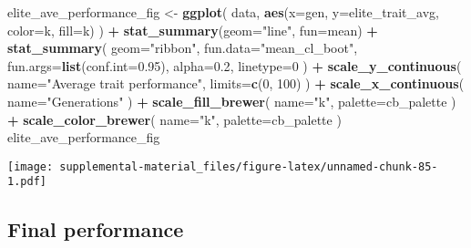 \documentclass[]{book}
\newenvironment{Shaded}{\begin{snugshade}}{\end{snugshade}}
\newcommand{\DataTypeTok}[1]{\textcolor[rgb]{0.13,0.29,0.53}{#1}}
\newcommand{\DecValTok}[1]{\textcolor[rgb]{0.00,0.00,0.81}{#1}}
\newcommand{\FloatTok}[1]{\textcolor[rgb]{0.00,0.00,0.81}{#1}}
\newcommand{\KeywordTok}[1]{\textcolor[rgb]{0.13,0.29,0.53}{\textbf{#1}}}
\newcommand{\NormalTok}[1]{#1}
\newcommand{\OperatorTok}[1]{\textcolor[rgb]{0.81,0.36,0.00}{\textbf{#1}}}
\newcommand{\StringTok}[1]{\textcolor[rgb]{0.31,0.60,0.02}{#1}}
\begin{document}
\begin{Shaded}
\begin{Highlighting}[]
\NormalTok{elite_ave_performance_fig <-}
\StringTok{  }\KeywordTok{ggplot}\NormalTok{(}
\NormalTok{    data,}
    \KeywordTok{aes}\NormalTok{(}\DataTypeTok{x=}\NormalTok{gen, }\DataTypeTok{y=}\NormalTok{elite_trait_avg, }\DataTypeTok{color=}\NormalTok{k, }\DataTypeTok{fill=}\NormalTok{k)}
\NormalTok{  ) }\OperatorTok{+}
\StringTok{  }\KeywordTok{stat_summary}\NormalTok{(}\DataTypeTok{geom=}\StringTok{"line"}\NormalTok{, }\DataTypeTok{fun=}\NormalTok{mean) }\OperatorTok{+}
\StringTok{  }\KeywordTok{stat_summary}\NormalTok{(}
    \DataTypeTok{geom=}\StringTok{"ribbon"}\NormalTok{,}
    \DataTypeTok{fun.data=}\StringTok{"mean_cl_boot"}\NormalTok{,}
    \DataTypeTok{fun.args=}\KeywordTok{list}\NormalTok{(}\DataTypeTok{conf.int=}\FloatTok{0.95}\NormalTok{),}
    \DataTypeTok{alpha=}\FloatTok{0.2}\NormalTok{,}
    \DataTypeTok{linetype=}\DecValTok{0}
\NormalTok{  ) }\OperatorTok{+}
\StringTok{  }\KeywordTok{scale_y_continuous}\NormalTok{(}
    \DataTypeTok{name=}\StringTok{"Average trait performance"}\NormalTok{,}
    \DataTypeTok{limits=}\KeywordTok{c}\NormalTok{(}\DecValTok{0}\NormalTok{, }\DecValTok{100}\NormalTok{)}
\NormalTok{  ) }\OperatorTok{+}
\StringTok{  }\KeywordTok{scale_x_continuous}\NormalTok{(}
    \DataTypeTok{name=}\StringTok{"Generations"}
\NormalTok{  ) }\OperatorTok{+}
\StringTok{  }\KeywordTok{scale_fill_brewer}\NormalTok{(}
    \DataTypeTok{name=}\StringTok{"k"}\NormalTok{,}
    \DataTypeTok{palette=}\NormalTok{cb_palette}
\NormalTok{  ) }\OperatorTok{+}
\StringTok{  }\KeywordTok{scale_color_brewer}\NormalTok{(}
    \DataTypeTok{name=}\StringTok{"k"}\NormalTok{,}
    \DataTypeTok{palette=}\NormalTok{cb_palette}
\NormalTok{  )}
\NormalTok{elite_ave_performance_fig}
\end{Highlighting}
\end{Shaded}

\texttt{[image: supplemental-material\_files/figure-latex/unnamed-chunk-85-1.pdf]}

\hypertarget{final-performance-7}{%
\subsection{Final performance}\label{final-performance-7}}
\end{document}
